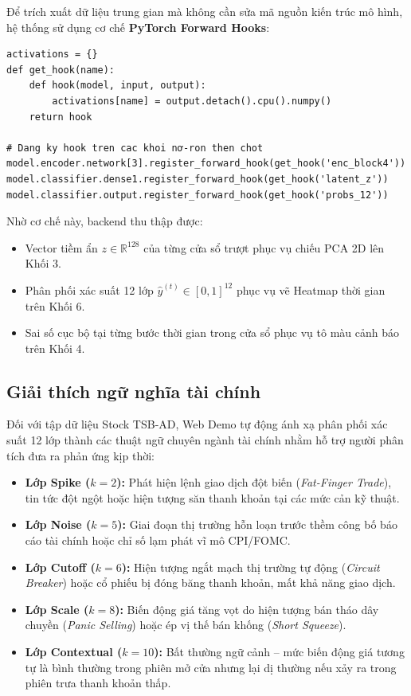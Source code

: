 \documentclass[sigconf,nonacm]{acmart}
\begin{document}
Để trích xuất dữ liệu trung gian mà không cần sửa mã nguồn kiến trúc mô hình, hệ thống sử dụng cơ chế \textbf{PyTorch Forward Hooks}:

\begin{lstlisting}
activations = {}
def get_hook(name):
    def hook(model, input, output):
        activations[name] = output.detach().cpu().numpy()
    return hook

# Dang ky hook tren cac khoi nơ-ron then chot
model.encoder.network[3].register_forward_hook(get_hook('enc_block4'))
model.classifier.dense1.register_forward_hook(get_hook('latent_z'))
model.classifier.output.register_forward_hook(get_hook('probs_12'))
\end{lstlisting}

Nhờ cơ chế này, backend thu thập được:
\begin{itemize}[leftmargin=*, itemsep=2pt, parsep=0pt]
    \item Vector tiềm ẩn $z \in \mathbb{R}^{128}$ của từng cửa sổ trượt phục vụ chiếu PCA 2D lên Khối 3.
    \item Phân phối xác suất 12 lớp $\hat{y}^{(t)} \in [0, 1]^{12}$ phục vụ vẽ Heatmap thời gian trên Khối 6.
    \item Sai số cục bộ tại từng bước thời gian trong cửa sổ phục vụ tô màu cảnh báo trên Khối 4.
\end{itemize}

\subsection{Giải thích ngữ nghĩa tài chính}

Đối với tập dữ liệu Stock TSB-AD, Web Demo tự động ánh xạ phân phối xác suất 12 lớp thành các thuật ngữ chuyên ngành tài chính nhằm hỗ trợ người phân tích đưa ra phản ứng kịp thời:
\begin{itemize}[leftmargin=*, itemsep=2pt, parsep=0pt]
    \item \textbf{Lớp Spike ($k=2$):} Phát hiện lệnh giao dịch đột biến (\textit{Fat-Finger Trade}), tin tức đột ngột hoặc hiện tượng săn thanh khoản tại các mức cản kỹ thuật.
    \item \textbf{Lớp Noise ($k=5$):} Giai đoạn thị trường hỗn loạn trước thềm công bố báo cáo tài chính hoặc chỉ số lạm phát vĩ mô CPI/FOMC.
    \item \textbf{Lớp Cutoff ($k=6$):} Hiện tượng ngắt mạch thị trường tự động (\textit{Circuit Breaker}) hoặc cổ phiếu bị đóng băng thanh khoản, mất khả năng giao dịch.
    \item \textbf{Lớp Scale ($k=8$):} Biến động giá tăng vọt do hiện tượng bán tháo dây chuyền (\textit{Panic Selling}) hoặc ép vị thế bán khống (\textit{Short Squeeze}).
    \item \textbf{Lớp Contextual ($k=10$):} Bất thường ngữ cảnh -- mức biến động giá tương tự là bình thường trong phiên mở cửa nhưng lại dị thường nếu xảy ra trong phiên trưa thanh khoản thấp.
\end{itemize}
\end{document}

